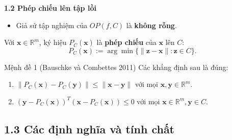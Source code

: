 \begin{frame}[t]{\textbf{\large 1.2 Phép chiếu lên tập lồi}}
    \vspace*{-1cm}
    \begin{itemize}
        \item Giả sử tập nghiệm của $OP(f, C)$ là \textbf{không rỗng}.
    \end{itemize}
    
    \vspace{0.3cm}
    
    Với $\mathbf{x} \in \mathbb{R}^m$, ký hiệu $P_C(\mathbf{x})$ là \textbf{phép chiếu} của $\mathbf{x}$ lên $C$:
    \[
        P_C(\mathbf{x}) := \arg\min\{\|\mathbf{z} - \mathbf{x}\| : \mathbf{z} \in C\}.
    \]

    \pause
    \vspace{0.5cm}

    \begin{block}{Mệnh đề 1 (Bauschke và Combettes 2011)}
        Các khẳng định sau là đúng:
        \begin{enumerate}
            \item $\|P_C(\mathbf{x}) - P_C(\mathbf{y})\| \le \|\mathbf{x} - \mathbf{y}\|$ với mọi $\mathbf{x}, \mathbf{y} \in \mathbb{R}^m$.
            \item $(\mathbf{y} - P_C(\mathbf{x}))^T(\mathbf{x} - P_C(\mathbf{x})) \le 0$ với mọi $\mathbf{x} \in \mathbb{R}^m, \mathbf{y} \in C$.
        \end{enumerate}
    \end{block}
\end{frame}

\subsection{1.3 Các định nghĩa và tính chất}

